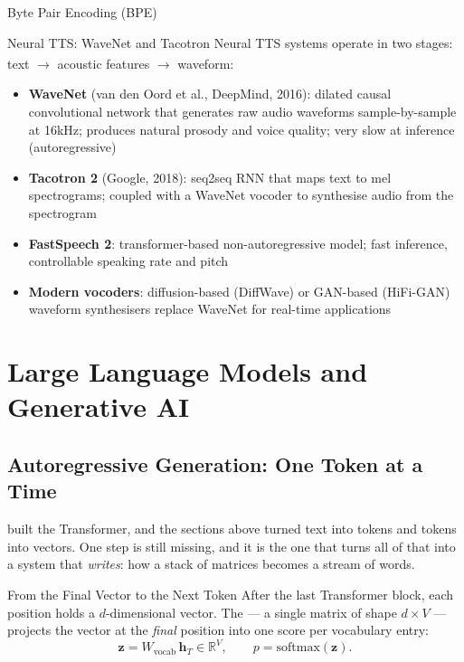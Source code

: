 \begin{v3topic}{Byte Pair Encoding (BPE)}
\begin{v3topic}{Neural TTS: WaveNet and Tacotron}
    Neural TTS systems operate in two stages: text $\to$ acoustic features $\to$ waveform\textsuperscript{\cite[][p.~11]{dhamaniIntroductionGenerativeAI2024}}:
    \begin{itemize}
        \item \textbf{WaveNet} (van den Oord et al., DeepMind, 2016): dilated causal convolutional network that generates raw audio waveforms sample-by-sample at 16kHz; produces natural prosody and voice quality; very slow at inference (autoregressive)
        \item \textbf{Tacotron 2} (Google, 2018): seq2seq RNN that maps text to mel spectrograms; coupled with a WaveNet vocoder to synthesise audio from the spectrogram
        \item \textbf{FastSpeech 2}: transformer-based non-autoregressive model; fast inference, controllable speaking rate and pitch
        \item \textbf{Modern vocoders}: diffusion-based (DiffWave) or GAN-based (HiFi-GAN) waveform synthesisers replace WaveNet for real-time applications
    \end{itemize}
\end{v3topic}

\section{Large Language Models and Generative AI}

\subsection{Autoregressive Generation: One Token at a Time}
\label{sec:nlp-autoregressive-generation}

 built the Transformer, and the sections above turned
text into tokens and tokens into vectors. One step is still missing, and it is
the one that turns all of that into a system that \emph{writes}: how a stack of
matrices becomes a stream of words.

\begin{v3topic}{From the Final Vector to the Next Token}
After the last Transformer block, each position holds a $d$-dimensional vector.
The  --- a single matrix of shape $d \times V$ --- projects
the vector at the \emph{final} position into one score per vocabulary entry:
\begin{equation}
  \mathbf{z} = W_{\text{vocab}}\,\mathbf{h}_T \in \mathbb{R}^{V},
  \qquad
  p = \mathrm{softmax}(\mathbf{z}) .
  \label{eq:nlp-output-head}
\end{equation}


\end{v3topic}
\end{v3topic}
